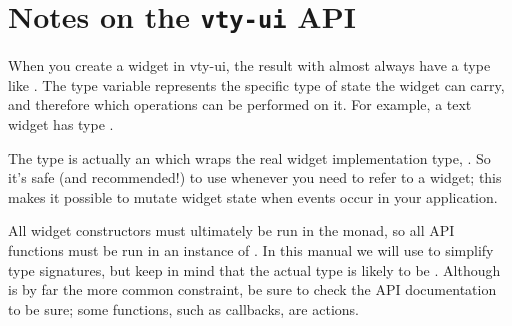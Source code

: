 \section{Notes on the \texttt{vty-ui} API}

When you create a widget in vty-ui, the result with almost always have
a type like .  The type variable  represents the
specific type of state the widget can carry, and therefore which
operations can be performed on it.  For example, a text widget has
type .

The  type is actually an  which wraps the real
widget implementation type, .  So it's safe (and
recommended!) to use  whenever you need to refer to a
widget; this makes it possible to mutate widget state when events
occur in your application.

All widget constructors must ultimately be run in the  monad,
so all API functions must be run in an instance of .  In
this manual we will use  to simplify type signatures, but keep
in mind that the actual type is likely to be .
Although  is by far the more common constraint, be sure to
check the API documentation to be sure; some functions, such as
callbacks, are  actions.
